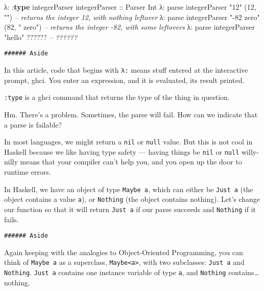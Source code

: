 \documentclass[]{article}
\newenvironment{Shaded}{}{}
\newcommand{\KeywordTok}[1]{\textcolor[rgb]{0.00,0.44,0.13}{\textbf{{#1}}}}
\newcommand{\DataTypeTok}[1]{\textcolor[rgb]{0.56,0.13,0.00}{{#1}}}
\newcommand{\DecValTok}[1]{\textcolor[rgb]{0.25,0.63,0.44}{{#1}}}
\newcommand{\StringTok}[1]{\textcolor[rgb]{0.25,0.44,0.63}{{#1}}}
\newcommand{\CommentTok}[1]{\textcolor[rgb]{0.38,0.63,0.69}{\textit{{#1}}}}
\newcommand{\OtherTok}[1]{\textcolor[rgb]{0.00,0.44,0.13}{{#1}}}
\newcommand{\FunctionTok}[1]{\textcolor[rgb]{0.02,0.16,0.49}{{#1}}}
\newcommand{\NormalTok}[1]{{#1}}
\begin{document}
\begin{Shaded}
\begin{Highlighting}[]
\NormalTok{λ}\FunctionTok{:} \FunctionTok{:}\KeywordTok{type} \NormalTok{integerParser}
\OtherTok{integerParser ::} \DataTypeTok{Parser} \DataTypeTok{Int}
\NormalTok{λ}\FunctionTok{:} \NormalTok{parse integerParser }\StringTok{"12"}
\NormalTok{(}\DecValTok{12}\NormalTok{, }\StringTok{""}\NormalTok{)                    }\CommentTok{-- returns the integer 12, with nothing leftover}
\NormalTok{λ}\FunctionTok{:} \NormalTok{parse integerParser }\StringTok{"-82 zero"}
\NormalTok{(}\DecValTok{82}\NormalTok{, }\StringTok{" zero"}\NormalTok{)               }\CommentTok{-- returns the integer -82, with some leftovers}
\NormalTok{λ}\FunctionTok{:} \NormalTok{parse integerParser }\StringTok{"hello"}
\FunctionTok{??????}                      \CommentTok{-- ??????}
\end{Highlighting}
\end{Shaded}

\begin{verbatim}
###### Aside
\end{verbatim}

In this article, code that begins with \texttt{λ:} means stuff entered at the interactive prompt,
ghci. You enter an expression, and it is evaluated, its result printed.

\texttt{:type} is a ghci command that returns the type of the thing in question.

Hm. There's a problem. Sometimes, the parse will fail. How can we indicate that a parse is failable?

In most languages, we might return a \texttt{nil} or \texttt{null} value. But this is not cool in
Haskell because we like having type safety --- having things be \texttt{nil} or \texttt{null}
willy-nilly means that your compiler can't help you, and you open up the door to runtime errors.

In Haskell, we have an object of type \texttt{Maybe\ a}, which can either be \texttt{Just\ a} (the
object contains a value \texttt{a}), or \texttt{Nothing} (the object contains nothing). Let's change
our function so that it will return \texttt{Just\ a} if our parse succeeds and \texttt{Nothing} if
it fails.

\begin{verbatim}
###### Aside
\end{verbatim}

Again keeping with the analogies to Object-Oriented Programming, you can think of \texttt{Maybe\ a}
as a superclass, \texttt{Maybe\textless{}a\textgreater{}}, with two subclasses: \texttt{Just\ a} and
\texttt{Nothing}. \texttt{Just\ a} contains one instance variable of type \texttt{a}, and
\texttt{Nothing} contains\ldots{}nothing.
\end{document}
